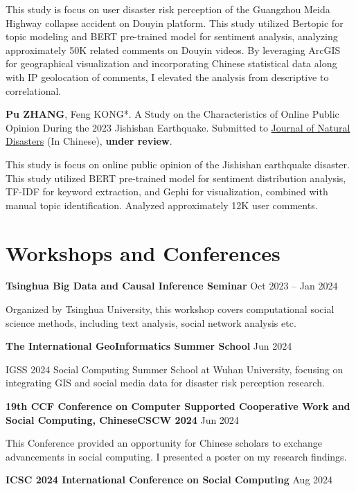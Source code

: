 \documentclass[letterpaper, 11pt]{article}
\begin{document}
This study is focus on user disaster risk perception of the Guangzhou Meida Highway collapse accident on Douyin platform. This study utilized Bertopic for topic modeling and BERT pre-trained model for sentiment analysis, analyzing approximately 50K related comments on Douyin videos. By leveraging ArcGIS for geographical visualization and incorporating Chinese statistical data along with IP geolocation of comments, I elevated the analysis from descriptive to correlational.

\vspace{0.5em}
\textbf{Pu ZHANG}, Feng KONG*. A Study on the Characteristics of Online Public Opinion During the 2023 Jishishan Earthquake. Submitted to {\href{https://zrzh.paperonce.org/#/}{Journal of Natural Disasters}} (In Chinese), \textbf{under review}.

This study is focus on online public opinion of the Jishishan earthquake disaster. This study utilized BERT pre-trained model for sentiment distribution analysis, TF-IDF for keyword extraction, and Gephi for visualization, combined with manual topic identification. Analyzed approximately 12K user comments.

\section{Workshops and Conferences}
\textbf{Tsinghua Big Data and Causal Inference Seminar} \hfill Oct 2023 -- Jan 2024

Organized by Tsinghua University, this workshop covers computational social science methods, including text analysis, social network analysis etc.

\vspace{0.5em}
\textbf{The International GeoInformatics Summer School} \hfill Jun 2024

IGSS 2024 Social Computing Summer School at Wuhan University, focusing on integrating GIS and social media data for disaster risk perception research.

\vspace{0.5em}
\textbf{19th CCF Conference on Computer Supported Cooperative Work and Social Computing, ChineseCSCW 2024} \hfill Jun 2024

This Conference provided an opportunity for Chinese scholars to exchange advancements in social computing. I presented a poster on my research findings.

\vspace{0.5em}
\textbf{ICSC 2024 International Conference on Social Computing} \hfill Aug 2024
\end{document}
